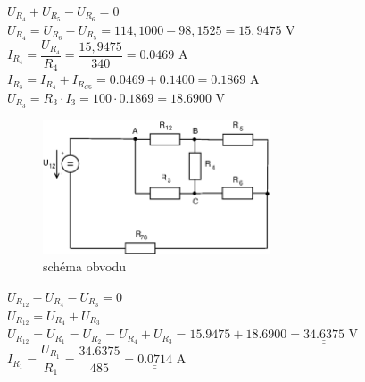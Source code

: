 \documentclass[10pt,a4paper]{article}
\def\doubleunderline#1{\underline{\underline{#1}}}
\begin{document}
   \begin{center}
     \begin{large}
      $ U_{R_4} + U_{R_5} - U_{R_6} = 0$
      \\[6pt]
      $ U_{R_4} = U_{R_6} - U_{R_5} = 114,1000 - 98,1525 = 15,9475 $ V
      \\[6pt]
      $ I_{R_4} = \dfrac{U_{R_4}}{R_4} = \dfrac{15,9475}{340} = 0.0469  $ A
      \\[20pt]
      $ I_{R_3} = I_{R_4} +  I_{R_{C6}} =0.0469 + 0.1400 = 0.1869  $ A
      \\[6pt]
      $ U_{R_3}= R_3 \cdot I_3=100 \cdot 0.1869  =18.6900 $ V
      \\[20pt]
   \end{large}
  \end{center}
  
  \begin{figure}[ht]
    \begin{center}
     \includegraphics[width=0.6\textwidth]{2018.eps}
      \caption{schéma obvodu}
    \end{center}
   \end{figure}
   \newpage
   
   \begin{center}
     \begin{large}
      $ U_{R_{12}} -  U_{R_4} - U_{R_3} =  0 $
      \\[6pt]
      $ U_{R_{12}} =  U_{R_4} + U_{R_3}$
      \\[6pt]
      $ U_{R_{12}} = U_{R_1} = U_{R_2} =  U_{R_4} + U_{R_3} = 15.9475 + 18.6900 = \doubleunderline{34.6375} $ V
      \\[6pt]
      $ I_{R_1} = \dfrac{U_{R_1}}{R_1} = \dfrac {34.6375}{485} = \doubleunderline{0.0714} $ A    
   \end{large}
  \end{center}
  
\end{document}
